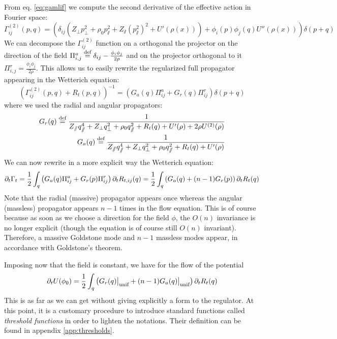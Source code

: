 From eq. \eqref{eq:gamlif} we compute the second derivative of the effective action in Fourier space:
\begin{equation}
\Gamma^{(2)}_{ij}(p,q) = 
\left( \delta_{ij} \left(Z_\perp p_{\perp}^2 +\rho_0 p_{\sslash}^2 +Z_\sslash (p_\sslash^2)^2 + U'(\rho (x))\right)+\phi_i(p) \phi_j(q) U''(\rho (x)) \right) \delta(p+q)
\end{equation}
We can decompose the $\Gamma^{(2)}_{ij}$ function on a orthogonal the projector on the direction of the field $\Pi^a_{i,j}  \overset{\text{def}}{=}  \delta_{ij} - \frac{\phi_i \phi_j}{2 \rho}$ and on the projector orthogonal to it $\Pi^r_{i,j} = \frac{\phi_i \phi_j}{2 \rho}$.
This allows us to easily rewrite the regularized full propagator appearing in the Wetterich equation:
\begin{equation}
\label{eq:gam2}
\left( \Gamma^{(2)}_{ij}(p,q) + R_t(p,q) \right)^{-1} = \left( G_a(q) \Pi^a_{ij} + G_r(q) \Pi^r_{ij} \right) \delta(p+q)
\end{equation}
where we used the radial and angular propagators:
\begin{align}
G_r(q)  \overset{\text{def}}{=}  \frac{1}{Z_\sslash q_\sslash^4 + Z_\perp q_\perp^2 + \rho_0 q_\sslash^2 + R_t(q)  + U'(\rho) + 2 \rho U^{(2)}(\rho)} \\
G_a(q)  \overset{\text{def}}{=}  \frac{1}{Z_\sslash q_\sslash^4 + Z_\perp q_\perp^2 + \rho_0 q_\sslash^2 + R_t(q) + U'(\rho)}
\end{align}
We can now rewrite in a more explicit way the Wetterich equation:
\begin{equation}
\partial_{t} \Gamma_t = \frac{1}{2} \int_q \left(  G_a(q) \Pi^a_{ij} + G_r(p) \Pi^r_{ij} \right) \partial_{t} R_{t,ij}(q)  = \frac{1}{2} \int_q \left(  G_a(q) + (n-1)G_r(p) \right) \partial_{t} R_{t}(q) 
\end{equation}
Note that the radial (massive) propagator appears once whereas the angular (massless) propagator appears $n-1$ times in the flow equation. This is of course because as soon as we choose a direction for the field $\phi$, the  $O(n)$ invariance is no longer explicit (though the equation is of course still $O(n)$ invariant). Therefore, a massive Goldstone mode and $n-1$ massless modes appear, in accordance with Goldstone's theorem.

Imposing now that the field is constant, we have for the flow of the potential
\begin{equation}
\partial_{t} U(\phi_0) = \frac{1}{2} \int_q \left( G_r(q) \big|_{\text{unif}}  + (n-1)G_a(q) \big|_{\text{unif}}  \right) \partial_{t} R_t(q)
\end{equation}
This is as far as we can get without giving explicitly a form to the regulator. 
At this point, it is a customary procedure to introduce standard functions called \textit{threshold functions} in order to lighten the notations. Their definition can be found in appendix \eqref{app:thresholds}.

